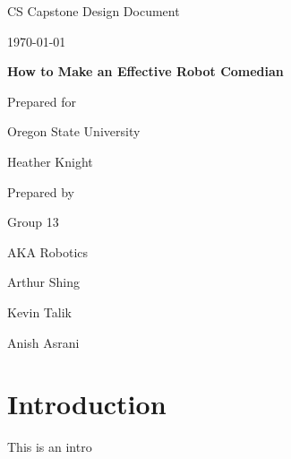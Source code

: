 \documentclass[onecolumn, draftclsnofoot,10pt, compsoc]{IEEEtran}
\def \CapstoneTeamName{		AKA Robotics}
\def \CapstoneTeamNumber{		13}
\def \GroupMemberOne{     Arthur Shing}
\def \GroupMemberTwo{			Kevin Talik}
\def \GroupMemberThree{   Anish Asrani}
\def \CapstoneProjectName{		How to Make an Effective Robot Comedian}
\def \CapstoneSponsorCompany{	Oregon State University}
\def \CapstoneSponsorPerson{		Heather Knight}
\def \DocType{		%
				Design Document
				}
\newcommand{\NameSigPair}[1]{\par
\makebox[2.75in][r]{#1} \hfil 	\makebox[3.25in]{\makebox[2.25in]{\hrulefill} \hfill		\makebox[.75in]{\hrulefill}}
\par\vspace{-12pt} \textit{\tiny\noindent
\makebox[2.75in]{} \hfil		\makebox[3.25in]{\makebox[2.25in][r]{Signature} \hfill	\makebox[.75in][r]{Date}}}}
\renewcommand{\NameSigPair}[1]{#1}
\begin{document}
\begin{titlepage}
    \begin{singlespace}
        \hfill 
        \par\vspace{.2in}
        \centering
        \scshape{
            \huge CS Capstone \DocType \par
            {\large\today}\par
            \vspace{.5in}
            \textbf{\Huge\CapstoneProjectName}\par
            \vfill
            {\large Prepared for}\par
            \Huge \CapstoneSponsorCompany\par
            \vspace{5pt}
            {\Large\NameSigPair{\CapstoneSponsorPerson}\par}
            {\large Prepared by }\par
            Group\CapstoneTeamNumber\par
            \CapstoneTeamName\par 
            \vspace{5pt}
            {\Large
                \NameSigPair{\GroupMemberOne}\par
                \NameSigPair{\GroupMemberTwo}\par
                \NameSigPair{\GroupMemberThree}\par
            }
            \vspace{20pt}
        }
        \begin{abstract}
        \end{abstract}     
    \end{singlespace}
\end{titlepage}
\newpage
{}
\tableofcontents
\clearpage

\section{Introduction}
  This is an intro
\end{document}
